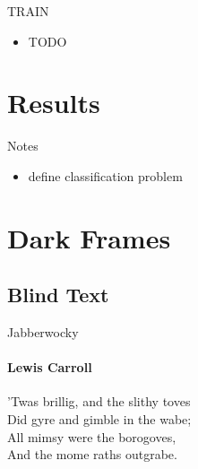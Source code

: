 \documentclass{beamer}
\begin{document}
\begin{darkframes}
    \begin{frame}{TRAIN}
      \begin{itemize}
        \item TODO
      \end{itemize}
    \end{frame}

    \section{Results}
    \begin{frame}{}
    \end{frame}
      
    \begin{frame}{Notes}
      \begin{itemize}
        \item define classification problem
      \end{itemize}
    \end{frame}



    \section{Dark Frames}
    \subsection{Blind Text}
    \begin{frame}{Jabberwocky}
      \framesubtitle{Lewis Carroll}%
      'Twas brillig, and the slithy toves\\
      Did gyre and gimble in the wabe;\\
      All mimsy were the borogoves,\\
      And the mome raths outgrabe.\\\bigskip


\end{frame}
\end{darkframes}
\end{document}
